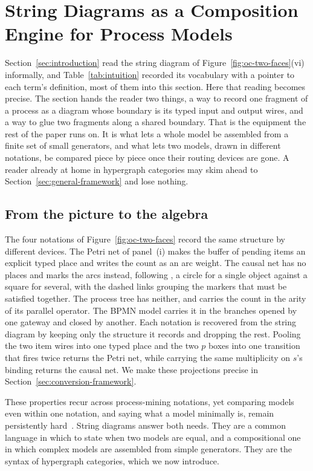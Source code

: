 \section{String Diagrams as a Composition Engine for Process Models}\label{sec:hypergraphs}

Section~\ref{sec:introduction} read the string diagram of Figure~\ref{fig:oc-two-faces}(vi)
informally, and Table~\ref{tab:intuition} recorded its vocabulary with a pointer to each term's
definition, most of them into this section. Here that reading becomes precise. The section hands
the reader two things, a way to record one fragment of a process as a diagram whose boundary is
its typed input and output wires, and a way to glue two fragments along a shared boundary. That
is the equipment the rest of the paper runs on. It is what lets a whole model be assembled from a
finite set of small generators, and what lets two models, drawn in different notations, be
compared piece by piece once their routing devices are gone. A reader already at home in
hypergraph categories may skim ahead to Section~\ref{sec:general-framework} and lose nothing.

\subsection{From the picture to the algebra}

The four notations of Figure~\ref{fig:oc-two-faces} record the same structure by different devices.
The Petri net of panel~(i) makes the buffer of pending items an explicit typed place and writes the count as an
arc weight. The causal net has no places and marks the arcs instead, following \citet{lissObjectCentricCausalNets2025}, a circle for a single object against a square for
several, with the dashed links grouping the markers that must be satisfied together. The process
tree has neither, and carries the count in the arity of its parallel operator. The BPMN model
carries it in the branches opened by one gateway and closed by another. Each notation
is recovered from the string diagram by keeping only the structure it records and dropping the rest.
Pooling the two item wires into one typed place and the two $p$ boxes into one transition that fires
twice returns the Petri net, while carrying the same multiplicity on $s$'s binding returns the
causal net. We make these projections precise in Section~\ref{sec:conversion-framework}.

These properties recur across process-mining notations, yet comparing models even
within one notation, and saying what a model minimally is, remain persistently
hard~\cite{vanderaalstRepresentationalBiasProcess2011,vanderaalstImprovingRepresentationalBias2012}.
String diagrams answer both needs. They are a common language in which to state when two
models are equal, and a compositional one in which complex models are assembled
from simple generators. They are the syntax of hypergraph categories, which
we now introduce.

